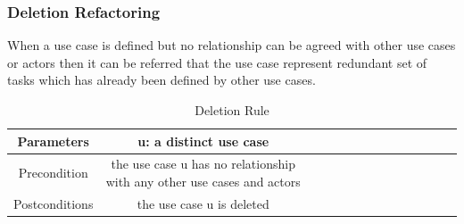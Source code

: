 \subsubsection{Deletion Refactoring}\label{section:selection_by_use_case/guidelines_for_use_case_refactoring/deletion_refactoring}
When a use case is defined but no relationship can be agreed with other use cases or actors then it can be referred that the use case represent redundant set of tasks which has already been defined by other use cases.
\begin{table}[H]
  \centering
  \begin{adjustbox}{max width=\textwidth}
  \begin{tabular}{*{14}{|c}|}%
  \hline
  Parameters      & u: a distinct use case\\
                    \hline
   Precondition     & the use case u has no relationship with any other use cases and actors\\
                    \hline
   Postconditions   & the use case u is deleted\\
                    \hline
\end{tabular}
\end{adjustbox}
  \caption{Deletion Rule}
  \label{tab:selection_by_use_case/guidelines_for_use_case_refactoring/deletion_rule}
\end{table}
\\

